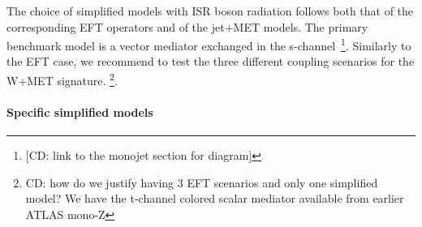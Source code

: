 The choice of simplified models with ISR boson radiation follows both that of the corresponding EFT operators and of the jet+MET models. The primary benchmark model is a vector mediator exchanged in the s-channel~\footnote{[CD: link to the monojet section for diagram]}. Similarly to the EFT case, we recommend to test the three different coupling scenarios for the W+MET signature. \footnote{CD: how do we justify having 3 EFT scenarios and only one simplified model? We have the t-channel colored scalar mediator available from earlier ATLAS mono-Z}.

\paragraph{Specific simplified models}
